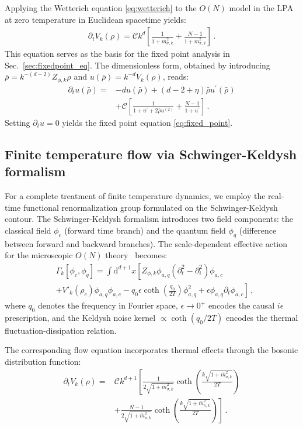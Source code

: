 \documentclass[reprint,twocolumn,superscriptaddress,preprintnumbers,amsmath,amssymb,aps,prd,floatfix]{revtex4-2}
\def\Sec#1{Sec.~\ref{#1}}
\begin{document}
Applying the Wetterich equation \eqref{eq:wetterich} to the $O(N)$ model in the LPA at zero temperature in Euclidean spacetime yields:
\begin{align}
\partial_t V_k(\rho)=\mathscr{C} k^d\left[\frac{1}{1+\bar{m}_{\sigma, k}^2}+\frac{N-1}{1+\bar{m}_{\pi, k}^2}\right]\,.
\label{eq:flow_potential_zeroT}
\end{align}
This equation serves as the basis for the fixed point analysis in \Sec{sec:fixedpoint_eq}. The dimensionless form, obtained by introducing $\bar{\rho}=k^{-(d-2)} Z_{\phi, k} \rho$ and $u(\bar{\rho})=k^{-d} V_k(\rho)$, reads:
\begin{align}
	\partial_t u(\bar{\rho})= & -d u(\bar{\rho})+(d-2+\eta) \bar{\rho} u^{\prime}(\bar{\rho}) \nonumber\\
	& +\mathscr{C}\left[\frac{1}{1+u^{\prime}+2 \bar{\rho} u^{(2)}}+\frac{N-1}{1+u^{\prime}}\right]\,.
	\label{eq:flow_potential_dimensionless}
\end{align}
Setting $\partial_t u = 0$ yields the fixed point equation \eqref{eq:fixed_point}.

\subsection{Finite temperature flow via Schwinger-Keldysh formalism}
\label{app:finite_T}

For a complete treatment of finite temperature dynamics, we employ the real-time functional renormalization group formulated on the Schwinger-Keldysh contour. The Schwinger-Keldysh formalism introduces two field components: the classical field $\phi_c$ (forward time branch) and the quantum field $\phi_q$ (difference between forward and backward branches). The scale-dependent effective action for the microscopic $O(N)$ theory~\cite{Tan:2021zid} becomes:
\begin{align}
&\Gamma_k\left[\phi_c, \phi_q\right]=\int \mathrm{d}^{d+1}x\left[Z_{\phi, k}\phi_{a,q}\left(\partial^2_t-\partial^2_i \right)\phi_{a,c}\right.\nonumber\\[2ex]
&\left.+V'_k(\rho_c)\phi_{a,q}\phi_{a,c}- q_0\epsilon\coth\left(\frac{q_0}{2T}\right)\phi_{a,q}^2 +\epsilon\phi_{a,q}\partial_t\phi_{a,c}\right]\,,
\end{align}
where $q_0$ denotes the frequency in Fourier space, $\epsilon\to 0^+$ encodes the causal $i\epsilon$ prescription, and the Keldysh noise kernel $\propto\coth(q_0/2T)$ encodes the thermal fluctuation-dissipation relation.

The corresponding flow equation incorporates thermal effects through the bosonic distribution function:
\begin{align}
\partial_t V_k(\rho)=&\mathscr{C} k^{d+1}\left[\frac{1}{2\sqrt{1+\bar{m}_{\sigma, k}^2}}\coth\left(\frac{k\sqrt{1+\bar{m}_{\sigma, k}^2}}{2T}\right)\right.\nonumber\\[2ex]
&\left.+\frac{N-1}{2\sqrt{1+\bar{m}_{\pi, k}^2}}\coth\left(\frac{k\sqrt{1+\bar{m}_{\pi, k}^2}}{2T}\right)\right]\,.
\label{eq:flow_potential_microscopic}
\end{align}
\end{document}
